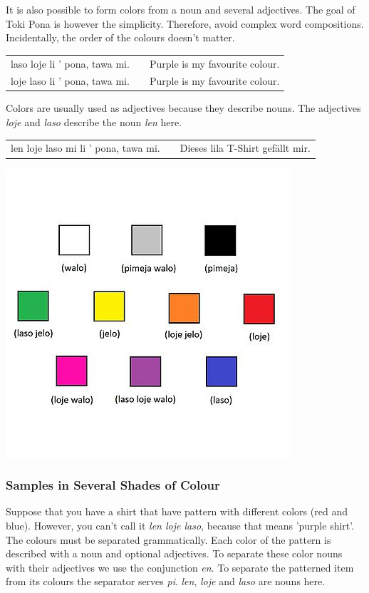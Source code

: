 It is also possible to form colors from a noun and several adjectives. 
The goal of Toki Pona is however the simplicity.
Therefore, avoid complex word compositions.
Incidentally, the order of the colours doesn't matter.

\begin{supertabular}{p{5,5cm}|ll}
laso loje  li ' pona, tawa mi. && Purple is my favourite colour.  \\ %
loje laso  li ' pona, tawa mi. && Purple is my favourite colour.  \\
\end{supertabular}

Colors are usually used as adjectives because they describe nouns. 
The adjectives \textit{loje} and \textit{laso} describe the noun \textit{len} here.

\begin{supertabular}{p{5,5cm}|ll}
len loje laso mi li ' pona, tawa mi. && Dieses lila T-Shirt gefällt mir. \\
\end{supertabular}

%
\includegraphics[scale=0.4]{colors.png}
%
\subsubsection*{Samples in Several Shades of Colour}
%
%
Suppose that you have a shirt that have pattern with different colors (red and blue). 
However, you can't call it \textit{len loje laso}, because that means 'purple shirt'. 
The colours must be separated grammatically. 
Each color of the pattern is described with a noun and optional adjectives. 
To separate these color nouns with their adjectives we use the conjunction \textit{en}.
To separate the patterned item from its colours the separator serves \textit{pi}.
\textit{len}, \textit{loje} and \textit{laso} are nouns here. 

